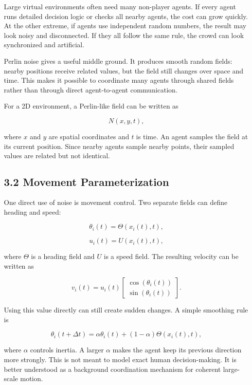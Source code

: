 \documentclass[
  11pt,
]{article}
\begin{document}
Large virtual environments often need many non-player agents. If every
agent runs detailed decision logic or checks all nearby agents, the cost
can grow quickly. At the other extreme, if agents use independent random
numbers, the result may look noisy and disconnected. If they all follow
the same rule, the crowd can look synchronized and artificial.

Perlin noise gives a useful middle ground. It produces smooth random
fields: nearby positions receive related values, but the field still
changes over space and time. This makes it possible to coordinate many
agents through shared fields rather than through direct agent-to-agent
communication.

For a 2D environment, a Perlin-like field can be written as

\[
N(x,y,t),
\]

where \(x\) and \(y\) are spatial coordinates and \(t\) is time. An
agent samples the field at its current position. Since nearby agents
sample nearby points, their sampled values are related but not
identical.

\subsection{3.2 Movement
Parameterization}\label{movement-parameterization}

One direct use of noise is movement control. Two separate fields can
define heading and speed:

\[
\theta_i(t) = \Theta(x_i(t),t),
\]

\[
u_i(t) = U(x_i(t),t),
\]

where \(\Theta\) is a heading field and \(U\) is a speed field. The
resulting velocity can be written as

\[
v_i(t) =
u_i(t)
\begin{bmatrix}
\cos(\theta_i(t)) \\
\sin(\theta_i(t))
\end{bmatrix}.
\]

Using this value directly can still create sudden changes. A simple
smoothing rule is

\[
\theta_i(t+\Delta t)
=
\alpha \theta_i(t)
+
(1-\alpha)\Theta(x_i(t),t),
\]

where \(\alpha\) controls inertia. A larger \(\alpha\) makes the agent
keep its previous direction more strongly. This is not meant to model
exact human decision-making. It is better understood as a background
coordination mechanism for coherent large-scale motion.
\end{document}
